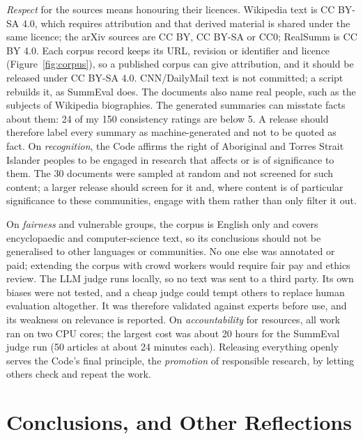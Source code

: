 \documentclass[11pt]{article}
\begin{document}
\emph{Respect} for the sources means honouring their licences. Wikipedia text is CC BY-SA 4.0, which requires attribution and that derived material is shared under the same licence; the arXiv sources are CC BY, CC BY-SA or CC0; RealSumm is CC BY 4.0. Each corpus record keeps its URL, revision or identifier and licence (Figure~\ref{fig:corpus}), so a published corpus can give attribution, and it should be released under CC BY-SA 4.0. CNN/DailyMail text is not committed; a script rebuilds it, as SummEval does. The documents also name real people, such as the subjects of Wikipedia biographies. The generated summaries can misstate facts about them: 24 of my 150 consistency ratings are below 5. A release should therefore label every summary as machine-generated and not to be quoted as fact. On \emph{recognition}, the Code affirms the right of Aboriginal and Torres Strait Islander peoples to be engaged in research that affects or is of significance to them. The 30 documents were sampled at random and not screened for such content; a larger release should screen for it and, where content is of particular significance to these communities, engage with them rather than only filter it out.

On \emph{fairness} and vulnerable groups, the corpus is English only and covers encyclopaedic and computer-science text, so its conclusions should not be generalised to other languages or communities. No one else was annotated or paid; extending the corpus with crowd workers would require fair pay and ethics review. The LLM judge runs locally, so no text was sent to a third party. Its own biases were not tested, and a cheap judge could tempt others to replace human evaluation altogether. It was therefore validated against experts before use, and its weakness on relevance is reported. On \emph{accountability} for resources, all work ran on two CPU cores; the largest cost was about 20 hours for the SummEval judge run (50 articles at about 24 minutes each). Releasing everything openly serves the Code's final principle, the \emph{promotion} of responsible research, by letting others check and repeat the work.

\section{Conclusions, and Other Reflections}
\label{sec:conclusions}
\end{document}
